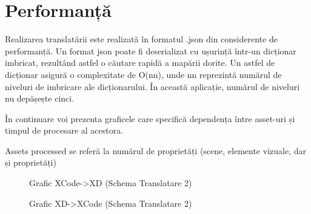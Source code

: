 \section{Performanță}

Realizarea translatării este realizată în formatul .json din considerente de performanță. Un format json poate fi deserializat cu ușurință într-un dicționar imbricat, rezultând astfel o căutare rapidă a mapării dorite. Un astfel de dicționar asigură o complexitate de O(nn), unde nn reprezintă numărul de niveluri de imbricare ale dicționarului. În această aplicație, numărul de niveluri nu depășește cinci.  

În continuare voi prezenta graficele care specifică dependența între asset-uri și timpul de procesare al acestora.

Assets processed se referă la numărul de proprietăți (scene, elemente vizuale, dar și proprietăți)

\begin{figure}[!htbp]
\centering
\caption{Grafic XCode->XD (Schema Translatare 2)} \label{fig:Grafic1}
\end{figure}

\begin{figure}[!htbp]
\centering
{}
\caption{Grafic XD->XCode (Schema Translatare 2)} \label{fig:Grafic1}
\end{figure}

